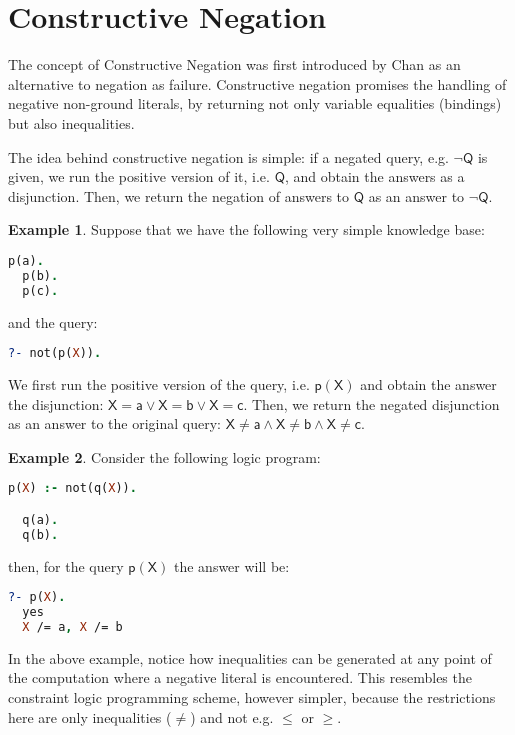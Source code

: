 \documentclass[inscr,ack,preface]{dithesis}
\theoremstyle{definition}
\newtheorem{example}{Example}[chapter]
\newcommand{\msf}[1]{$\mathsf{#1}$}
\begin{document}
\section{Constructive Negation}
The concept of Constructive Negation was first introduced by Chan \cite{DBLP:conf/iclp/Chan88} as an alternative to negation as failure. Constructive negation promises the handling of negative non-ground literals, by returning not only variable equalities (bindings) but also inequalities.

The idea behind constructive negation is simple: if a negated query, e.g. \msf{\lnot Q} is given, we run the positive version of it, i.e. \msf{Q}, and obtain the answers as a disjunction. Then, we return the negation of answers to \msf{Q} as an answer to \msf{\lnot Q}.

\begin{example} Suppose that we have the following very simple knowledge base:
\begin{lstlisting}[language=Prolog,frame=single]
  p(a).
  p(b).
  p(c).
\end{lstlisting}
and the query:
\begin{lstlisting}[language=Prolog,frame=single]
  ?- not(p(X)).
\end{lstlisting}
We first run the positive version of the query, i.e. \msf{p(X)} and obtain the answer the disjunction: \msf{X = a \lor X = b \lor X = c}. Then, we return the negated disjunction as an answer to the original query: \msf{X \ne a \land X \ne b \land X \ne c}.
\end{example}

\begin{example} Consider the following logic program:
\begin{lstlisting}[language=Prolog,frame=single]
  p(X) :- not(q(X)).

  q(a).
  q(b).
\end{lstlisting}
then, for the query \msf{p(X)} the answer will be:
\begin{lstlisting}[language=Prolog,frame=single]
  ?- p(X).
  yes
  X /= a, X /= b
\end{lstlisting}
\end{example}

In the above example, notice how inequalities can be generated at any point of the computation where a negative literal is encountered. This resembles the constraint logic programming scheme, however simpler, because the restrictions here are only inequalities (\msf{\ne}) and not e.g. \msf{\le} or \msf{\ge}.
\end{document}
